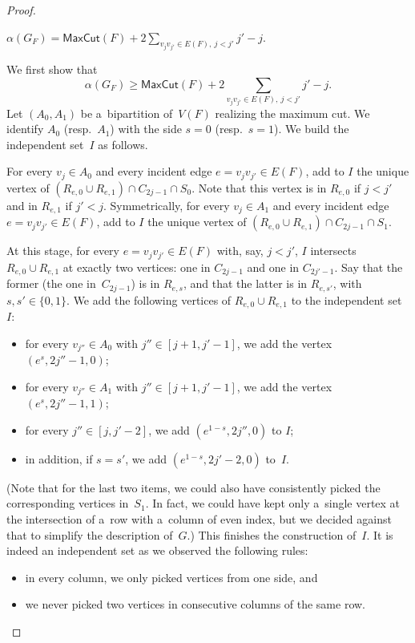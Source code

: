 \documentclass[a4paper,UKenglish,cleveref,autoref]{lipics-v2021}
\newcommand{\maxcut}{\mathsf{MaxCut}}
\begin{document}
\begin{proof}
  \begin{claim}
\leavevmode
$\alpha(G_F) = \maxcut(F) + 2 \sum\limits_{v_j v_{j'} \in E(F),~j<j'} j'-j$.
  \end{claim}
\begin{claimproof}
\leavevmode
We first show that \[\alpha(G_F) \geqslant \maxcut(F) + 2 \sum\limits_{v_j v_{j'} \in E(F),~j<j'} j'-j.\]
    Let $(A_0,A_1)$ be a~bipartition of~$V(F)$ realizing the maximum cut.
    We identify $A_0$ (resp.~$A_1$) with the side $s=0$ (resp.~$s=1$).
    We build the independent set~$I$ as follows.

    For every $v_j \in A_0$ and every incident edge $e = v_jv_{j'} \in E(F)$, add to $I$ the unique vertex of $(R_{e,0} \cup R_{e,1}) \cap C_{2j-1} \cap S_0$.
    Note that this vertex is in $R_{e,0}$ if $j < j'$ and in $R_{e,1}$ if $j' < j$.
    Symmetrically, for every $v_j \in A_1$ and every incident edge $e = v_jv_{j'} \in E(F)$, add to $I$ the unique vertex of $(R_{e,0} \cup R_{e,1}) \cap C_{2j-1} \cap S_1$.

    At this stage, for every $e=v_jv_{j'} \in E(F)$ with, say, $j < j'$, $I$ intersects $R_{e,0} \cup R_{e,1}$ at exactly two vertices: one in $C_{2j-1}$ and one in $C_{2j'-1}$.
    Say that the former (the one in~$C_{2j-1}$) is in $R_{e,s}$, and that the latter is in $R_{e,s'}$, with $s, s' \in \{0,1\}$.
    We add the following vertices of $R_{e,0} \cup R_{e,1}$ to the independent set~$I$:
    \begin{itemize}
    \item for every $v_{j''} \in A_0$ with $j'' \in [j+1,j'-1]$, we add the vertex $(e^s,2j''-1,0)$;
    \item for every $v_{j''} \in A_1$ with $j'' \in [j+1,j'-1]$, we add the vertex $(e^s,2j''-1,1)$; 
    \item for every $j'' \in [j,j'-2]$, we add $(e^{1-s},2j'',0)$ to $I$;
    \item in addition, if $s=s'$, we add $(e^{1-s},2j'-2,0)$ to~$I$.
    \end{itemize}
    
    (Note that for the last two items, we could also have consistently picked the corresponding vertices in~$S_1$.
    In fact, we could have kept only a~single vertex at the intersection of a~row with a~column of even index, but we decided against that to simplify the description of~$G$.)
    This finishes the construction of~$I$.
    It is indeed an independent set as we observed the following rules:
    \begin{itemize}
    \item in every column, we only picked vertices from one side, and
    \item we never picked two vertices in consecutive columns of the same row.
    \end{itemize}
    

\end{claimproof}
\end{proof}
\end{document}
